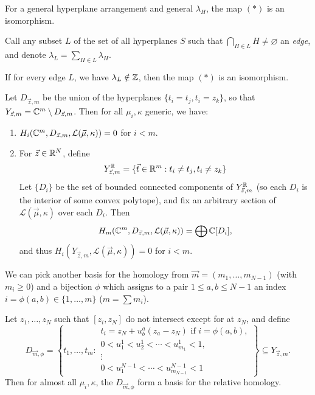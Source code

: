 \begin{theorem}
  For a general hyperplane arrangement
  and general $\lambda_H$, the
  map $(*)$
  is an isomorphism.
\end{theorem}

\begin{definition}
  Call any subset $L$ of the set of
  all hyperplanes $S$ such that
  $\bigcap_{H \in L} H \ne \varnothing$
  an \emph{edge}, and denote
  $\lambda_L = \sum_{H \in L} \lambda_H$.
\end{definition}

\begin{theorem}
  If for every edge $L$,
  we have $\lambda_L \notin \mathbb{Z}$,
  then the map $(*)$ is an isomorphism.
\end{theorem}

\begin{theorem}
  Let $D_{\vec{z}, m}$ be the
  union of the hyperplanes
  $\{t_i = t_j, t_i = z_k\}$, so that
  $Y_{\vec{z}, m} = \mathbb{C}^m \setminus D_{\vec{z}, m}$.
  Then for all $\mu_i, \kappa$ generic,
  we have:
  \begin{enumerate}
    \item $H_i(\mathbb{C}^m, D_{\vec{z}, m}, \mathcal{L}(\vec{\mu}, \kappa)) = 0$
      for $i < m$.
    \item For $\vec{z} \in \mathbb{R}^N$,
      define
      \[
        Y_{\vec{z}, m}^{\mathbb{R}}
        = \{\vec{t} \in \mathbb{R}^m : t_i \ne t_j, t_i \ne z_k\}
      \]
      Let $\{D_i\}$ be the set of bounded
      connected components of
      $Y_{\vec{z}, m}^{\mathbb{R}}$ (so each $D_i$ is
      the interior
      of some convex polytope), and fix
      an arbitrary section of
      $\mathcal{L}(\vec{\mu}, \kappa)$
      over each $D_i$. Then
      \[
        H_m(\mathbb{C}^m, D_{\vec{z}, m}, \mathcal{L}(\vec{\mu}, \kappa))
        = \bigoplus \mathbb{C} [D_i],
      \]
      and thus
      $H_i(Y_{\vec{z}, m}, \mathcal{L}(\vec{\mu}, \kappa)) = 0$
      for $i < m$.
  \end{enumerate}
\end{theorem}

\begin{remark}
  We can pick another basis for
  the homology
  from
  $\vec{m} = (m_1, \dots, m_{N - 1})$
  (with $m_i \ge 0$) and a bijection $\phi$ which assigns to a
  pair $1 \le a, b \le N - 1$ an
  index $i = \phi(a, b) \in \{1, \dots, m\}$
  ($m = \sum m_i$).
\end{remark}

\begin{theorem}
  Let $z_1, \dots, z_N$ such that
  $[z_i, z_N]$ do not intersect
  except for at $z_N$, and define
  \[
    D_{\vec{m}, \phi}
    =
    \left\{
      t_1, \dots, t_m
      : \substack{\displaystyle t_i = z_N + u^a_b(z_a - z_N)\text{ if } i = \phi(a, b),\\
      \displaystyle 0 < u_1^1 < u_2^1 < \cdots < u^1_{m_1} < 1, \\ \displaystyle \vdots \\ \displaystyle 0 < u_1^{N - 1} < \cdots < u^{N - 1}_{m_{N - 1}} < 1}
    \right\}
    \subseteq Y_{\vec{z}, m}.
  \]
  Then for almost all $\mu_i, \kappa$,
  the $D_{\vec{m}, \phi}$ form a basis
  for the relative homology.
\end{theorem}

